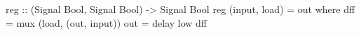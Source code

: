 \begin{haskellcode}
    reg :: (Signal Bool, Signal Bool) -> Signal Bool
    reg (input, load) = out
        where
            dff = mux (load, (out, input))
            out = delay low dff
\end{haskellcode}

